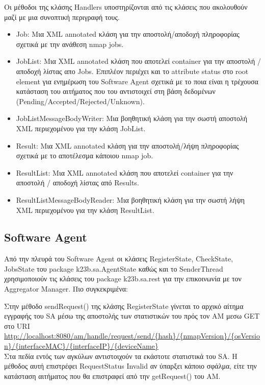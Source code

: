 \documentclass[a4paper,11pt]{article}
\begin{document}
\begin{sloppypar}
Οι μέθοδοι της κλάσης Handlers υποστηρίζονται από τις κλάσεις που ακολουθούν μαζί με μια συνοπτική περιγραφή τους.

\begin{itemize}

\item Job: Μια XML annotated κλάση για την αποστολή/αποδοχή πληροφορίας σχετικά με την ανάθεση nmap jobs. 
\item JobList: Μια XML annotated κλάση που αποτελεί container για την αποστολή / αποδοχή λίστας απο Jobs. Επιπλέον περιέχει και το attribute status στο root element για ενημέρωση του Software Agent σχετικά με το ποια είναι η τρέχουσα κατάσταση του αιτήματος που του αντιστοιχεί στη βάση δεδομένων (Pending/Accepted/Rejected/Unknown).
\item JobListMessageBodyWriter: Μια βοηθητική κλάση για την σωστή αποστολή XML περιεχομένου για την κλάση JobList.
\item Result: Μια XML annotated κλάση για την αποστολή/λήψη πληροφορίας σχετικά με το αποτέλεσμα κάποιου nmap job.
\item ResultList: Μια XML annotated κλάση που αποτελεί container για την αποστολή / αποδοχή λίστας από Results.
\item ResultListMessageBodyReader: Μια βοηθητική κλάση για την σωστή λήψη XML περιεχομένου για την κλάση ResultList.

\end{itemize}

\newpage


\subsection{Software Agent}

Από την πλευρά του Software Agent οι κλάσεις RegisterState, CheckState, JobsState του package k23b.sa.AgentState καθώς και το SenderThread χρησιμοποιούν τις κλάσεις του package k23b.sa.rest για την επικοινωνία με τον Aggregator Manager. Πιο συγκεκριμένα:

Στην μέθοδο sendRequest() της κλάσης RegisterState γίνεται το αρχικό αίτημα εγγραφής του SA μέσω της αποστολής των στατιστικών του πρός τον AM μεσω GET στο URI
\\
\url{http://localhost:8080/am/handle/request/send/{hash}/{nmapVersion}/{osVersion}/{interfaceMAC}/{interfaceIP}/{deviceName}}
\\
Στα πεδία εντός των αγκύλων αντιστοιχούν τα εκάστοτε στατιστικά του SA. Η μέθοδος αυτή επιστρέφει RequestStatus Invalid αν ύπαρξει κάποιο σφάλμα, είτε την κατάσταση αιτήματος που θα επιστραφεί από την getRequest() του ΑΜ.


\end{sloppypar}
\end{document}
